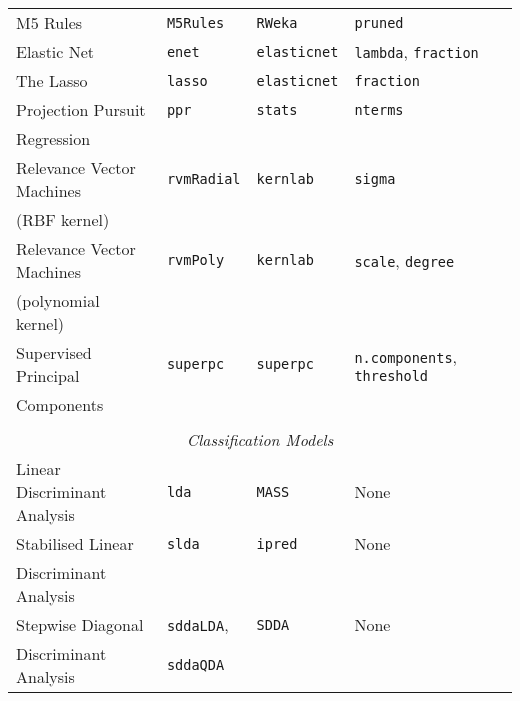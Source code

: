 \documentclass[12pt]{article}
\begin{document}
\begin{longtable}{lllll}
      M5 Rules &
         \texttt{M5Rules} & 
            \texttt{RWeka}    & 
            \texttt{pruned}  \\             
      
      Elastic Net &
         \texttt{enet} & 
            \texttt{elasticnet}      & 
            \texttt{lambda}, \texttt{fraction} \\          

      The Lasso &
         \texttt{lasso} & 
            \texttt{elasticnet}      & 
            \texttt{fraction} \\       

      Projection Pursuit   &
         \texttt{ppr} & 
            \texttt{stats}       & 
            \texttt{nterms} \\            
      \:\: Regression & & &\\             
            
      Relevance Vector Machines  &
         \texttt{rvmRadial} & 
            \texttt{kernlab}       & 
            \texttt{sigma} \\            
      \:\: (RBF kernel) & & &\\   
      
      Relevance Vector Machines  &
         \texttt{rvmPoly} & 
            \texttt{kernlab}       & 
            \texttt{scale}, \texttt{degree} \\            
      \:\: (polynomial kernel) & & &\\               

      Supervised Principal &
         \texttt{superpc}  &
         \texttt{superpc}  &
         \texttt{n.components}, 
         \texttt{threshold} \\
      \:\: Components  & & &\\
      \\       
             
\multicolumn{5}{c}{{{\em Classification Models}}} \\ 
      Linear Discriminant Analysis &
         \texttt{lda} & 
            \texttt{MASS}       &          
            None\\                     
      Stabilised Linear &
         \texttt{slda} & 
            \texttt{ipred}       &          
            None\\  
      \:\: Discriminant Analysis & & &\\
      
      Stepwise Diagonal &
        \texttt{sddaLDA}, &
        \texttt{SDDA} &
        None \\
      \:\: Discriminant Analysis & \texttt{sddaQDA} & &\\
            

\end{longtable}
\end{document}

